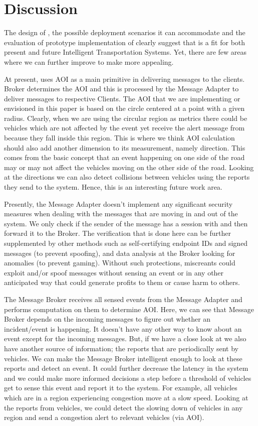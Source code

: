 \section{Discussion}

The design of \name, the possible deployment scenarios it can
accommodate and the evaluation of prototype implementation of \name{} 
clearly suggest that \name{} is a fit for both present and future
Intelligent Transportation Systems. Yet, there are few areas where we
can further improve to make \name{} more appealing.

At present, \name{} uses AOI as a main primitive in delivering
messages to the clients. \name{} Broker determines the AOI and this is
processed by the Message Adapter to deliver messages to respective Clients.
The AOI that we are implementing or envisioned in this paper is based
on the circle centered at a point with a given radius. Clearly, when
we are using the circular region as metrics there could be vehicles
which are not affected by the event yet receive the alert message from
\name{} because they fall inside this region. This is where we think
AOI calculation should also add another dimension to its measurement,
namely direction. This comes from the basic concept that an event
happening on one side of the road may or may not affect the vehicles
moving on the other side of the road. Looking at the directions we can
also detect collisions between vehicles using the reports they send to
the system.  Hence, this is an interesting future work area.

Presently, the Message Adapter doesn't implement any significant
security measures when dealing with the messages that are moving in
and out of the system. We only check if the sender of the message has
a session with \name{} and then forward it to the \name{} Broker. The
verification that is done here can be further supplemented by other
methods such as self-certifying endpoint IDs and signed messages (to
prevent spoofing), and data analysis at the Broker looking for
anomalies (to prevent gaming).  Without such protections, miscreants
could exploit and/or spoof messages without sensing an event or in any
other anticipated way that could generate profits to them or cause
harm to others.

The Message Broker receives all sensed events from the Message Adapter
and performs computation on them to determine AOI. Here, we can see
that Message Broker depends on the incoming messages to figure out
whether an incident/event is happening. It doesn't have any other way
to know about an event except for the incoming messages. But, if we
have a close look at \name{} we also have another source of
information; the reports that are periodically sent by vehicles.  We
can make the Message Broker intelligent enough to look at these
reports and detect an event. It could further decrease the latency in
the system and we could make more informed decisions a step before a
threshold of vehicles get to sense this event and report it to the
system. For example, all vehicles which are in a region experiencing
congestion move at a slow speed. Looking at the reports from vehicles,
we could detect the slowing down of vehicles in any region and send a
congestion alert to relevant vehicles (via AOI).

